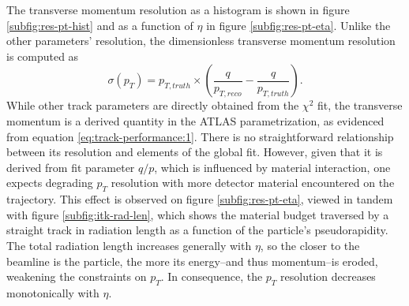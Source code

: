 \newpage
The transverse momentum resolution as a histogram is shown in figure \ref{subfig:res-pt-hist} and as a function of $\eta$ in figure \ref{subfig:res-pt-eta}.
Unlike the other parameters' resolution, the dimensionless transverse momentum resolution is computed as $$
\sigma(p_T) = p_{T,truth}  \times \left ( \frac{q}{p_{T, reco}} - \frac{q}{p_{T, truth}} \right).$$
While other track parameters are directly obtained from the $\chi^2$ fit, the transverse momentum is a derived quantity in the ATLAS parametrization, as evidenced from equation \eqref{eq:track-performance:1}. 
There is no straightforward relationship between its resolution and elements of the global fit.
However, given that it is derived from fit parameter $q/p$, which is influenced by material interaction, one expects degrading $p_T$ resolution with more detector material encountered on the trajectory.
This effect is observed on figure \ref{subfig:res-pt-eta},  viewed in tandem with figure \ref{subfig:itk-rad-len}, which shows the material budget traversed by a straight track in radiation length as a function of the particle's pseudorapidity.
The total radiation length increases generally with $\eta$, so the closer to the beamline is the particle, the more its energy--and thus momentum--is eroded, weakening the constraints on $p_T$. 
In consequence, the $p_T$ resolution decreases monotonically with $\eta$.

